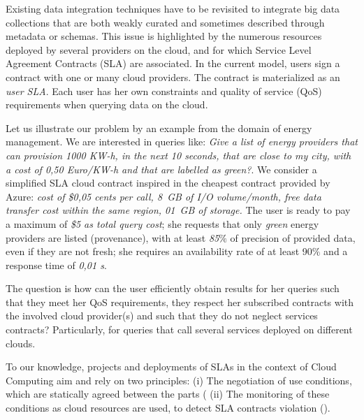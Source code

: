 \documentclass[10pt, conference, compsocconf]{IEEEtran}
\begin{document}
Existing data integration techniques have to be revisited to integrate big data collections that are both weakly curated and sometimes described through metadata or schemas. 
This issue is highlighted by the numerous resources deployed by several providers  on the cloud, and for which Service Level Agreement Contracts (SLA) are associated. 
In the current model, users sign a contract with one or many cloud providers.
The contract is materialized as an \textit{user SLA}. 
Each user has her own constraints and quality of service (QoS) requirements when querying data on the cloud. 

Let us illustrate our problem by an example from the domain of energy management.
We are interested in queries like: \textit{Give a list of energy providers that can provision 1000 KW-h, in the next 10 seconds, that are close to my city, with a cost of 0,50 Euro/KW-h and that are labelled as green?}. 
We consider a simplified SLA cloud contract inspired in the cheapest contract provided by Azure: \textit{cost of \$0,05 cents per call,  8~GB of I/O volume/month, free data transfer cost within the same region,  01~GB of storage.} 
The user is ready to pay a maximum of \textit{\$5 as total query cost}; she requests that only  \textit{green} energy providers are listed (provenance), with at least  \textit{85$\%$} of precision of provided data, even if they are not fresh; she requires an availability rate of at least 90$\%$ and a response time of  \textit{0,01 s}. 

    The question is how can the user efficiently obtain  results for her queries such that they meet her QoS requirements, they respect her subscribed contracts with the involved cloud provider(s) and such that they do not neglect services contracts? Particularly, for queries that call several services deployed  on different clouds.

To our knowledge, projects and deployments of SLAs in the context of Cloud Computing aim and rely on two principles: (i) The negotiation of use conditions, which are statically agreed between the parts (\cite{5547150,Dastjerdi:2012:DOA:2275356.2275360,Ortiz:2013:VPS:2486767.2486772} (ii) The monitoring of these conditions as cloud resources are used, to detect SLA contracts violation (\cite{6274042,5614035}).
\end{document}
